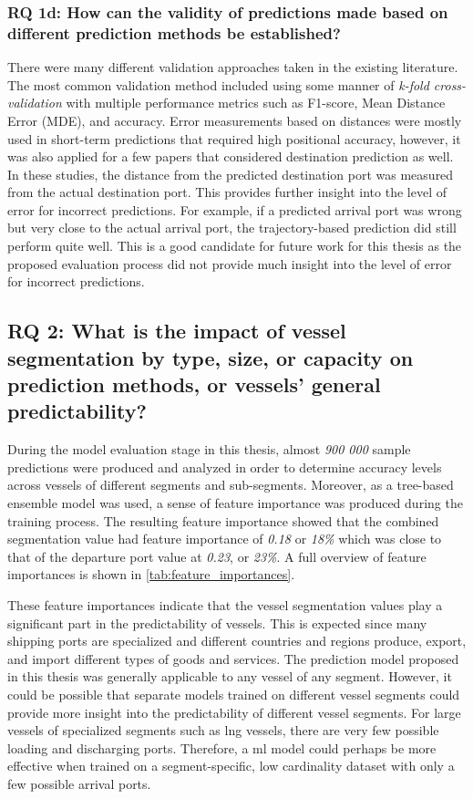 \subsubsection{RQ 1d: How can the validity of predictions made based on different prediction methods be established?}

There were many different validation approaches taken in the existing literature. The most common validation method included using some manner of \textit{k-fold cross-validation} with multiple performance metrics such as F1-score, Mean Distance Error (MDE), and accuracy. Error measurements based on distances were mostly used in short-term predictions that required high positional accuracy, however, it was also applied for a few papers that considered destination prediction as well. In these studies, the distance from the predicted destination port was measured from the actual destination port. This provides further insight into the level of error for incorrect predictions. For example, if a predicted arrival port was wrong but very close to the actual arrival port, the trajectory-based prediction did still perform quite well. This is a good candidate for future work for this thesis as the proposed evaluation process did not provide much insight into the level of error for incorrect predictions.

\subsection{RQ 2: What is the impact of vessel segmentation by type, size, or capacity on prediction methods, or vessels' general predictability?}

During the model evaluation stage in this thesis, almost \textit{900 000} sample predictions were produced and analyzed in order to determine accuracy levels across vessels of different segments and sub-segments. Moreover, as a tree-based ensemble model was used, a sense of feature importance was produced during the training process. The resulting feature importance showed that the combined segmentation value had feature importance of \textit{0.18} or \textit{18\%} which was close to that of the departure port value at \textit{0.23}, or \textit{23\%}. A full overview of feature importances is shown in \cref{tab:feature_importances}.

These feature importances indicate that the vessel segmentation values play a significant part in the predictability of vessels. This is expected since many shipping ports are specialized and different countries and regions produce, export, and import different types of goods and services. The prediction model proposed in this thesis was generally applicable to any vessel of any segment. However, it could be possible that separate models trained on different vessel segments could provide more insight into the predictability of different vessel segments. For large vessels of specialized segments such as \acrshort{lng} vessels, there are very few possible loading and discharging ports. Therefore, a \acrshort{ml} model could perhaps be more effective when trained on a segment-specific, low cardinality dataset with only a few possible arrival ports.

